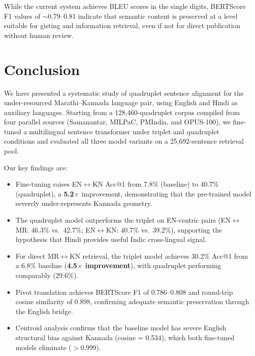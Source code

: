 \documentclass[conference,letterpaper]{IEEEtran}
\begin{document}
While the current system achieves BLEU scores in the single digits,
BERTScore F1 values of $\sim$0.79--0.81 indicate that semantic content
is preserved at a level suitable for gisting and information retrieval,
even if not for direct publication without human review.

\vspace{0.5cm}

\section{Conclusion}

We have presented a systematic study of quadruplet sentence alignment
for the under-resourced Marathi--Kannada language pair, using English
and Hindi as auxiliary languages. Starting from a 128,460-quadruplet
corpus compiled from four parallel sources (Samanantar, MILPaC, PMIndia,
and OPUS-100), we fine-tuned a multilingual sentence transformer under
triplet and quadruplet conditions and evaluated all three model variants
on a 25,692-sentence retrieval pool.

Our key findings are:
\begin{itemize}
    \item Fine-tuning raises EN$\leftrightarrow$KN Acc@1 from 7.8\%
    (baseline) to 40.7\% (quadruplet), a \textbf{5.2$\times$}
    improvement, demonstrating that the pre-trained model severely
    under-represents Kannada geometry.
    \item The quadruplet model outperforms the triplet on EN-centric
    pairs (EN$\leftrightarrow$MR: 46.3\% vs.\ 42.7\%;
    EN$\leftrightarrow$KN: 40.7\% vs.\ 39.2\%), supporting the
    hypothesis that Hindi provides useful Indic cross-lingual signal.
    \item For direct MR$\leftrightarrow$KN retrieval, the triplet model
    achieves 30.2\% Acc@1 from a 6.8\% baseline
    (\textbf{4.5$\times$ improvement}), with quadruplet performing
    comparably (29.6\%).
    \item Pivot translation achieves BERTScore F1 of 0.786--0.808 and
    round-trip cosine similarity of 0.898, confirming adequate semantic
    preservation through the English bridge.
    \item Centroid analysis confirms that the baseline model has severe
    English structural bias against Kannada (cosine = 0.534), which
    both fine-tuned models eliminate ($>$0.999).
\end{itemize}
\end{document}
